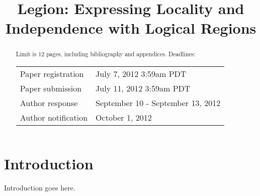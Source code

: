 \documentclass[9pt,nocopyrightspace,preprint]{sigplanconf}
\begin{document}
\title{Legion: Expressing Locality and Independence with Logical Regions}
\authorinfo{}{}{}
\maketitle

\begin{abstract}
Limit is 12 pages, including bibliography and appendices.
Deadlines: \\

\begin{tabular}{ll}
Paper registration & July 7, 2012 3:59am PDT \\
Paper submission & July 11, 2012 3:59am PDT \\
Author response & September 10 - September 13, 2012 \\
Author notification & October 1, 2012
\end{tabular}
\end{abstract}

\section{Introduction}
\label{sect:intro}
Introduction goes here.



{
\small

}
\end{document}
